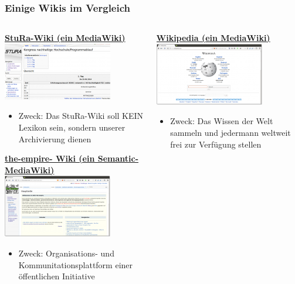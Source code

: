 \documentclass[handout]{beamer}   %
\begin{document}
\begin{frame}
  \frametitle{Einige Wikis im Vergleich}
  \begin{columns}
    \begin{column}{0.5\linewidth}
      \textbf{\href{http://wiki.stura.htw-dresden.de}{StuRa-Wiki (ein MediaWiki)}}
      \includegraphics{180px-Screenshot_Stura-Wiki-Bsp}
      \begin{itemize}
        \item Zweck: Das StuRa-Wiki soll KEIN Lexikon sein, sondern unserer Archivierung dienen
      \end{itemize}

      \textbf{\href{http://food.the-empire.de}{the-empire- Wiki (ein Semantic-MediaWiki)}}
	  \includegraphics{180px-TheEmpire-Wiki}
      \begin{itemize}
        \item Zweck: Organisations- und Kommunitationsplattform einer öffentlichen Initiative \\ 
      \end{itemize}
    \end{column}
    \begin{column}{0.5\linewidth}

      \textbf{\href{http://www.wikipedia.de}{Wikipedia (ein MediaWiki)}}
      \includegraphics{180px-Wikipedia-Startseite}
      \begin{itemize}
        \item Zweck: Das Wissen der Welt sammeln und jedermann weltweit frei zur Verfügung stellen
      \end{itemize}


\end{column}
\end{columns}
\end{frame}
\end{document}
